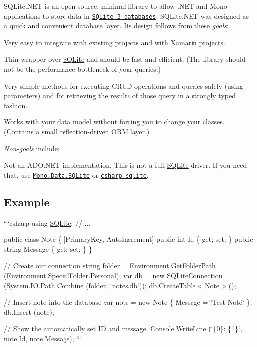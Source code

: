S\+Q\+Lite.\+N\+E\+T is an open source, minimal library to allow .N\+E\+T and Mono applications to store data in \href{http://www.sqlite.org}{\tt S\+Q\+Lite 3 databases}. S\+Q\+Lite.\+N\+E\+T was designed as a quick and convenient database layer. Its design follows from these {\itshape goals}\+:


\begin{DoxyItemize}
\item Very easy to integrate with existing projects and with Xamarin projects.
\item Thin wrapper over \hyperlink{namespace_s_q_lite}{S\+Q\+Lite} and should be fast and efficient. (The library should not be the performance bottleneck of your queries.)
\item Very simple methods for executing C\+R\+U\+D operations and queries safely (using parameters) and for retrieving the results of those query in a strongly typed fashion.
\item Works with your data model without forcing you to change your classes. (Contains a small reflection-\/driven O\+R\+M layer.)
\end{DoxyItemize}

{\itshape Non-\/goals} include\+:


\begin{DoxyItemize}
\item Not an A\+D\+O.\+N\+E\+T implementation. This is not a full \hyperlink{namespace_s_q_lite}{S\+Q\+Lite} driver. If you need that, use \href{http://www.mono-project.com/SQLite}{\tt Mono.\+Data.\+S\+Q\+Lite} or \href{http://code.google.com/p/csharp-sqlite/}{\tt csharp-\/sqlite}.
\end{DoxyItemize}

\subsection*{Example}

```csharp using \hyperlink{namespace_s_q_lite}{S\+Q\+Lite}; // ...

public class Note \{ \mbox{[}Primary\+Key, Auto\+Increment\mbox{]} public int Id \{ get; set; \} public string Message \{ get; set; \} \}

// Create our connection string folder = Environment.\+Get\+Folder\+Path (Environment.\+Special\+Folder.\+Personal); var db = new S\+Q\+Lite\+Connection (System.\+I\+O.\+Path.\+Combine (folder, \char`\"{}notes.\+db\char`\"{})); db.\+Create\+Table$<$\+Note$>$();

// Insert note into the database var note = new Note \{ Message = \char`\"{}\+Test Note\char`\"{} \}; db.\+Insert (note);

// Show the automatically set I\+D and message. Console.\+Write\+Line (\char`\"{}\{0\}\+: \{1\}\char`\"{}, note.\+Id, note.\+Message); ``` 
